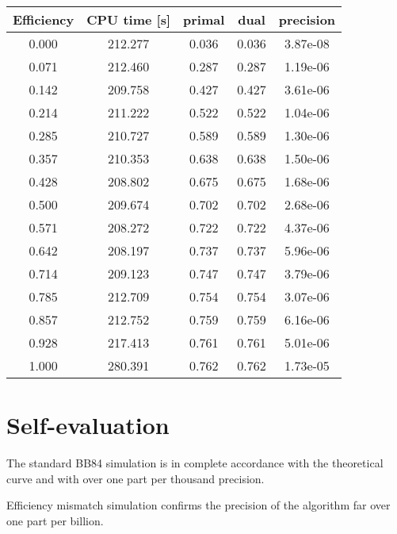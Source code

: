 \documentclass{article}
\begin{document}
 \begin{minipage}{\linewidth}
    \centering
    \begin{tabular}{c|c|c|c|c}
        Efficiency & CPU time [s]& primal& dual& precision\\
        \hline
        0.000 & 212.277 & 0.036 & 0.036 & 3.87e-08 \\
        0.071 & 212.460 & 0.287 & 0.287 & 1.19e-06 \\
        0.142 & 209.758 & 0.427 & 0.427 & 3.61e-06 \\
        0.214 & 211.222 & 0.522 & 0.522 & 1.04e-06 \\
        0.285 & 210.727 & 0.589 & 0.589 & 1.30e-06 \\
        0.357 & 210.353 & 0.638 & 0.638 & 1.50e-06 \\
        0.428 & 208.802 & 0.675 & 0.675 & 1.68e-06 \\
        0.500 & 209.674 & 0.702 & 0.702 & 2.68e-06 \\
        0.571 & 208.272 & 0.722 & 0.722 & 4.37e-06 \\
        0.642 & 208.197 & 0.737 & 0.737 & 5.96e-06 \\
        0.714 & 209.123 & 0.747 & 0.747 & 3.79e-06 \\
        0.785 & 212.709 & 0.754 & 0.754 & 3.07e-06 \\
        0.857 & 212.752 & 0.759 & 0.759 & 6.16e-06 \\
        0.928 & 217.413 & 0.761 & 0.761 & 5.01e-06 \\
        1.000 & 280.391 & 0.762 & 0.762 & 1.73e-05 \\ 
        \hline
    \end{tabular}
    \label{tbl:p-01}
\end{minipage}


\section{Self-evaluation}
The standard BB84 simulation is in complete accordance with the theoretical curve and with over one part per thousand precision.

Efficiency mismatch simulation confirms the precision of the algorithm far over one part per billion.


\end{document}
